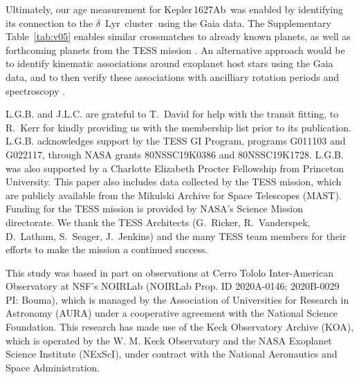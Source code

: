 \documentclass[12pt,modern,twocolumn,tighten]{aastex63}
\newcommand{\cn}{$\delta$\ Lyr\ cluster} %
\newcommand{\pn}{Kepler\,1627Ab} %
\begin{document}
Ultimately, our age measurement for \pn\ was enabled by identifying
its connection to the \cn\ using the Gaia data.  The Supplementary
Table~\ref{tab:v05} enables similar crossmatches to already known
planets, as well as forthcoming planets from the TESS mission
\citep{ricker_transiting_2015,guerrero_tess_2021}.  An alternative
approach would be to identify kinematic associations around exoplanet
host stars using the Gaia data, and to then verify these associations
with ancilliary rotation periods and spectroscopy
\citep{tofflemire_tess_2021}.







\acknowledgements
\raggedbottom

L.G.B{.} and J.L.C{.} are grateful to T{.}~David for help with the
transit fitting, to R{.}~Kerr for kindly providing us with the
\citet{kerr_stars_2021} membership list prior to its publication.
%
L.G.B{.} acknowledges support by the TESS GI Program, programs
G011103 and G022117, through NASA grants 80NSSC19K0386 and
80NSSC19K1728.
%
L.G.B{.} was also supported by a Charlotte Elizabeth Procter
Fellowship from Princeton University.
%
%
This paper also includes data collected by the TESS mission, which are
publicly available from the Mikulski Archive for Space Telescopes
(MAST).
%
Funding for the TESS mission is provided by NASA's Science Mission
directorate.
%
We thank the TESS Architects (G.~Ricker, R.~Vanderspek, D.~Latham,
S.~Seager, J.~Jenkins) and the many TESS team members for their
efforts to make the mission a continued success.
%

%
This study was based in part on observations at Cerro Tololo
Inter-American Observatory at NSF's NOIRLab (NOIRLab Prop{.} ID
2020A-0146; 2020B-0029 PI: Bouma), which is managed by the
Association of Universities for Research in Astronomy (AURA) under a
cooperative agreement with the National Science Foundation.
%
%
This research has made use of the Keck Observatory Archive (KOA),
which is operated by the W. M. Keck Observatory and the NASA Exoplanet
Science Institute (NExScI), under contract with the National
Aeronautics and Space Administration.
%
\end{document}
